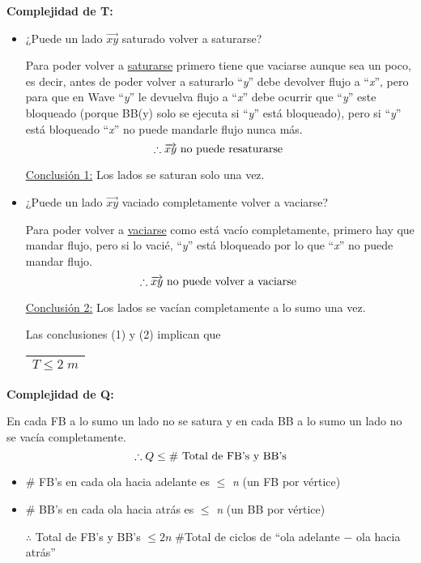 \documentclass[12pt,a4paper]{report}
\begin{document}
			\pagebreak
			\textbf{Complejidad de T:}
			\begin{itemize}
				\item ¿Puede un lado $\overrightarrow{xy}$ saturado volver a saturarse?
					\par Para poder volver a \underline{saturarse} primero tiene que vaciarse aunque sea un poco, es decir, antes de poder volver a saturarlo \textquotedblleft \textit{y}\textquotedblright \; debe devolver flujo a \textquotedblleft \textit{x}\textquotedblright \;, pero para que en Wave \textquotedblleft \textit{y}\textquotedblright \; le devuelva flujo a \textquotedblleft \textit{x}\textquotedblright \;  debe ocurrir que \textquotedblleft \textit{y}\textquotedblright \; este bloqueado (porque BB(y) solo se ejecuta si \textquotedblleft \textit{y}\textquotedblright \; está bloqueado), pero si \textquotedblleft \textit{y}\textquotedblright \; está bloqueado \textquotedblleft \textit{x}\textquotedblright \; no puede mandarle flujo nunca más.
					\[ \therefore \overrightarrow{xy} \textup{ no puede resaturarse } \]
					\par \underline{Conclusión 1:} Los lados se saturan solo una vez.
				\item ¿Puede un lado $\overrightarrow{xy}$ vaciado completamente volver a vaciarse?
					\par Para poder volver a \underline{vaciarse} como está vacío completamente, primero hay que mandar flujo, pero si lo vacié, \textquotedblleft \textit{y}\textquotedblright \; está bloqueado por lo que \textquotedblleft \textit{x}\textquotedblright \; no puede mandar flujo.
					\[ \therefore \overrightarrow{xy} \textup{ no puede volver a vaciarse } \]
					\par \underline{Conclusión 2:} Los lados se vacían completamente a lo sumo una vez.

				\par Las conclusiones (1) y (2) implican que \begin{tabular}{|c|} \hline $T \leq 2 \; m$ \\\hline \end{tabular}
			\end{itemize}

			\textbf{Complejidad de Q:}
				\par En cada FB a lo sumo un lado no se satura y en cada BB a lo sumo un lado no se vacía completamente.
				\[ \therefore Q \leq \# \textup{ Total de FB's y BB's} \]
				\begin{itemize}
					\item \# FB's en cada ola hacia adelante es $\leq$ \textit{n} (un FB por vértice)
					\item \# BB's en cada ola hacia atrás es $\leq$ \textit{n} (un BB por vértice)

					\vspace{5mm}
					\par $\therefore$ Total de FB's y BB's $\leq 2 n \; \#$Total de ciclos de \textquotedblleft ola adelante $-$ ola hacia atrás\textquotedblright
	 			\end{itemize}
\end{document}
